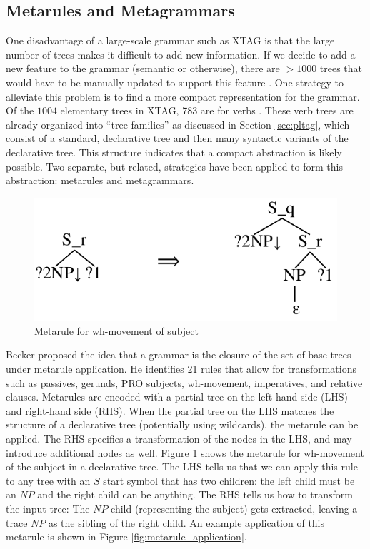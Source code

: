 \documentclass[11pt,a4paper]{article}
\begin{document}
\subsection{Metarules and Metagrammars}
\label{sec:metarules}

One disadvantage of a large-scale grammar such as XTAG is that the large number
of trees makes it difficult to add new information. If we decide to add a new 
feature to the grammar (semantic or otherwise), there are $>1000$ trees that 
would have to be manually updated to support this feature \cite{xtag}. One 
strategy to alleviate this problem is to find a more compact representation
for the grammar. Of the $1004$ elementary trees in XTAG, 783 are for verbs 
\cite{prolo2002generating}. These verb trees are already organized into ``tree 
families'' as discussed in Section \ref{sec:pltag}, which consist of a standard, 
declarative tree and then many syntactic variants of the declarative tree. This
structure indicates that a compact abstraction is likely possible. Two separate, 
but related, strategies have been applied to form this abstraction: metarules 
and metagrammars. 

\begin{figure}[h]
\begin{centering}
    \includegraphics[width=.7 \linewidth ]{resources/ch5_resources/metarule.pdf}
    \caption{Metarule for wh-movement of subject}
    \label{fig:metarule}
\end{centering}
\end{figure}

Becker \cite{becker1994patterns,becker2000patterns} proposed the idea that a
grammar is the closure of the set of base trees under metarule application.  He
identifies 21 rules that allow for transformations such as passives, gerunds,
PRO subjects, wh-movement, imperatives, and relative clauses. Metarules are
encoded with a partial tree on the left-hand side (LHS) and right-hand side
(RHS). When the partial tree on the LHS  matches the structure of a declarative
tree (potentially using wildcards), the metarule can be applied. The RHS
specifies a transformation of the nodes in the LHS, and may introduce additional
nodes as well. Figure \ref{fig:metarule} shows the metarule for wh-movement
of the subject in a declarative tree. The LHS tells us that we can
apply this rule to any tree with an $S$ start symbol that has two children: the
left child must be an $NP$ and the right child can be anything. The RHS tells us
how to transform the input tree: The $NP$ child (representing the subject) gets
extracted, leaving a trace $NP$ as the sibling of the right child. An example
application of this metarule is shown in Figure \ref{fig:metarule_application}.
\end{document}
